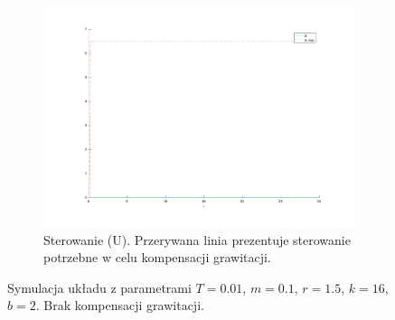 \documentclass[a4paper, 10pt]{article}
\begin{document}
\begin{figure}
\begin{subfigure}{.5\textwidth}
		\includegraphics[width=\linewidth]{mala_u}
		\caption{Sterowanie (U). Przerywana linia prezentuje sterowanie potrzebne w celu kompensacji grawitacji.}
		\label{fig:mala_u}
	\end{subfigure}
	\caption{Symulacja układu z parametrami $T=0.01$, $m = 0.1$, $r = 1.5$, $k = 16$, $b = 2$. Brak kompensacji grawitacji.}
	\label{fig:mala}
\end{figure}
\end{document}
